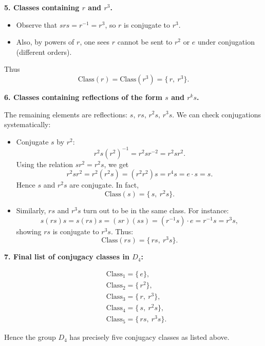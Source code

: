 \documentclass[12pt]{article}
\theoremstyle{definition} %
\theoremstyle{plain} %
\begin{document}
\bigskip

\noindent
\textbf{5. Classes containing $r$ and $r^3$.}

\begin{itemize}
    \item Observe that $srs = r^{-1} = r^3$, so $r$ is conjugate to $r^3$.
    \item Also, by powers of $r$, one sees $r$ cannot be sent to $r^2$ or $e$ under conjugation (different orders).
\end{itemize}
Thus 
\[
\text{Class}(r) = \text{Class}(r^3) = \{\, r,\ r^3 \}.
\]

\bigskip

\noindent
\textbf{6. Classes containing reflections of the form $s$ and $r^k s$.}

\noindent
The remaining elements are reflections: $s, \,rs, \,r^2s, \,r^3s$. We can check conjugations systematically:

\begin{itemize}
    \item Conjugate $s$ by $r^2$:
    \[
    r^2 s (r^2)^{-1} = r^2 s r^{-2} = r^2 s r^2.
    \]
    Using the relation $s r^2 = r^2 s$, we get
    \[
    r^2 s r^2 = r^2 (r^2 s) = (r^2 r^2) s = r^4 s = e \cdot s = s.
    \]
    Hence $s$ and $r^2 s$ are conjugate. In fact,
    \[
    \text{Class}(s) = \{\, s,\ r^2 s \}.
    \]

    \item Similarly, $r s$ and $r^3 s$ turn out to be in the same class. For instance:
    \[
    s (rs) s = s (rs) s = (s r) (s s) = (r^{-1} s) \cdot e = r^{-1} s = r^3 s,
    \]
    showing $rs$ is conjugate to $r^3 s$. Thus:
    \[
    \text{Class}(rs) = \{\, rs,\ r^3 s \}.
    \]
\end{itemize}

\bigskip

\noindent
\textbf{7. Final list of conjugacy classes in $D_4$:}

\[
\begin{aligned}
&\text{Class}_1 = \{\, e \}, \\
&\text{Class}_2 = \{\, r^2 \}, \\
&\text{Class}_3 = \{\, r,\ r^3 \}, \\
&\text{Class}_4 = \{\, s,\ r^2 s \}, \\
&\text{Class}_5 = \{\, rs,\ r^3 s \}.
\end{aligned}
\]

\bigskip

\noindent
Hence the group $D_4$ has precisely five conjugacy classes as listed above.
\end{document}
